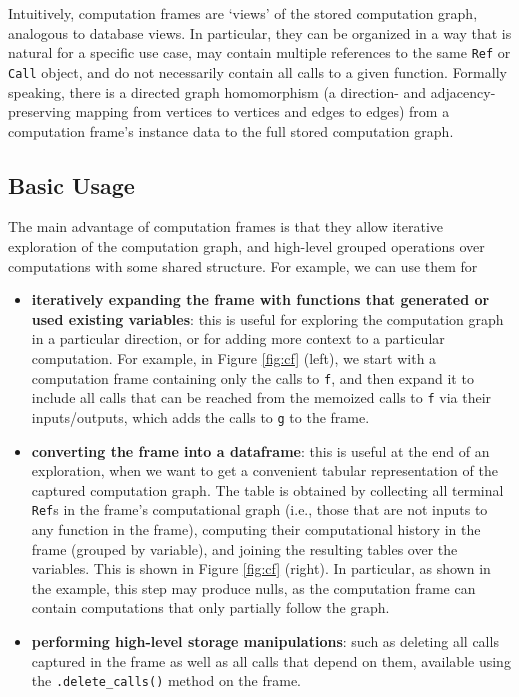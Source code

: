 \documentclass{article} %
\begin{document}
Intuitively, computation frames are `views' of the stored computation graph,
analogous to database views. In particular, they can be organized in a way that
is natural for a specific use case, may contain multiple references to the same
\texttt{Ref} or \texttt{Call} object, and do not necessarily contain all calls
to a given function. Formally speaking, there is a directed graph homomorphism
(a direction- and adjacency-preserving mapping from vertices to vertices and
edges to edges) from a computation frame's instance data to the full stored
computation graph.

\subsection{Basic Usage}
\label{subsection:cf-basic-usage}

The main advantage of computation frames is that they allow iterative
exploration of the computation graph, and high-level grouped operations over
computations with some shared structure. For example, we can use them for 
\begin{itemize}
\item \textbf{iteratively expanding the frame with functions that generated or
used existing variables}: this is useful for exploring the computation graph in
a particular direction, or for adding more context to a particular computation.
For example, in Figure \ref{fig:cf} (left), we start with a computation frame
containing only the calls to \texttt{f}, and then expand it to include all calls
that can be reached from the memoized calls to \texttt{f} via their
inputs/outputs, which adds the calls to \texttt{g} to the frame.
\item \textbf{converting the frame into a dataframe}: this is useful at the end
of an exploration, when we want to get a convenient tabular representation of
the captured computation graph. The table is obtained by collecting all terminal
\texttt{Ref}s in the frame's computational graph (i.e., those that are not
inputs to any function in the frame), computing their computational history in
the frame (grouped by variable), and joining the resulting tables over the
variables. This is shown in Figure \ref{fig:cf} (right). In particular, as shown
in the example, this step may produce nulls, as the computation frame can
contain computations that only partially follow the graph.
\item \textbf{performing high-level storage manipulations}: such as deleting all
calls captured in the frame as well as all calls that depend on them, available
using the \verb|.delete_calls()| method on the frame.
\end{itemize}
\end{document}
